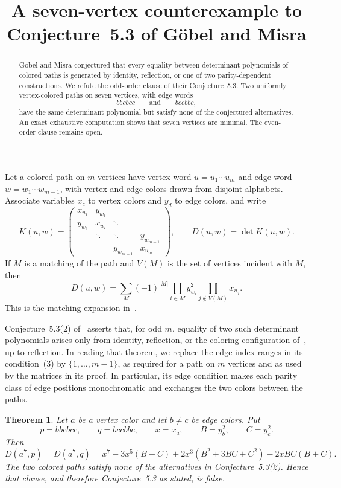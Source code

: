 \documentclass[11pt]{amsart}
\title[A seven-vertex counterexample]
{A seven-vertex counterexample to Conjecture~5.3 of G\"obel and Misra}
\date{}
\newtheorem{theorem}{Theorem}
\theoremstyle{remark}
\begin{document}
\begin{abstract}
G\"obel and Misra conjectured that every equality between determinant
polynomials of colored paths is generated by identity, reflection, or one of
two parity-dependent constructions. We refute the odd-order clause of their
Conjecture~5.3. Two uniformly vertex-colored paths on seven vertices, with
edge words
\[
  bbcbcc \qquad\text{and}\qquad bccbbc,
\]
have the same determinant polynomial but satisfy none of the conjectured
alternatives. An exact exhaustive computation shows that seven vertices are
minimal. The even-order clause remains open.
\end{abstract}

\maketitle

Let a colored path on $m$ vertices have vertex word
$u=u_1\cdots u_m$ and edge word $w=w_1\cdots w_{m-1}$, with vertex and
edge colors drawn from disjoint alphabets. Associate variables $x_c$ to
vertex colors and $y_d$ to edge colors, and write
\[
K(u,w)=
\begin{pmatrix}
 x_{u_1} & y_{w_1} \\
 y_{w_1} & x_{u_2} & \ddots \\
 & \ddots & \ddots & y_{w_{m-1}} \\
 & & y_{w_{m-1}} & x_{u_m}
\end{pmatrix},
\qquad
D(u,w)=\det K(u,w).
\]
If $M$ is a matching of the path and $V(M)$ is the set of vertices incident
with $M$, then
\begin{equation}\label{eq:matching}
D(u,w)=
\sum_M(-1)^{|M|}
\prod_{i\in M}y_{w_i}^{2}
\prod_{j\notin V(M)}x_{u_j}.
\end{equation}
This is the matching expansion in~\cite[Lemma~3.3]{GM}.

Conjecture~5.3(2) of~\cite{GM} asserts that, for odd $m$, equality of two
such determinant polynomials arises only from identity, reflection, or the
coloring configuration of~\cite[Theorem~3.8]{GM}, up to reflection. In
reading that theorem, we replace the edge-index ranges in its condition~(3)
by $\{1,\ldots,m-1\}$, as required for a path on $m$ vertices and as used by
the matrices in its proof. In particular, its edge condition makes each
parity class of edge positions monochromatic and exchanges the two colors
between the paths.

\begin{theorem}\label{thm:counterexample}
Let $a$ be a vertex color and let $b\ne c$ be edge colors. Put
\[
 p=bbcbcc,
 \qquad
 q=bccbbc,
 \qquad
 x=x_a,
 \qquad
 B=y_b^2,
 \qquad
 C=y_c^2.
\]
Then
\begin{equation}\label{eq:identity}
D(a^7,p)=D(a^7,q)
=x^7-3x^5(B+C)+2x^3(B^2+3BC+C^2)-2xBC(B+C).
\end{equation}
The two colored paths satisfy none of the alternatives in
Conjecture~5.3(2). Hence that clause, and therefore Conjecture~5.3 as stated,
is false.
\end{theorem}
\end{document}
